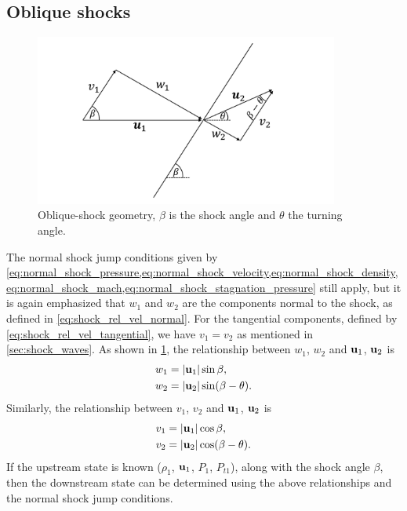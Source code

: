 \documentclass[oneside,a4paper,11pt]{report}
\begin{document}
\subsection{Oblique shocks}
\begin{figure}[ht]
\centering
\includegraphics[width=10cm]{../../../images/oblique_shock.pdf}
\caption{Oblique-shock geometry, $\beta$ is the shock angle and $\theta$ the turning angle.}
\label{fig:oblique_shock}
\end{figure}
The normal shock jump conditions given by \cref{eq:normal_shock_pressure,eq:normal_shock_velocity,eq:normal_shock_density,eq:normal_shock_mach,eq:normal_shock_stagnation_pressure} still apply, but it is again emphasized that $w_1$ and $w_2$ are the components normal to the shock, as defined in \cref{eq:shock_rel_vel_normal}. For the tangential components, defined by \cref{eq:shock_rel_vel_tangential}, we have $v_1 = v_2$ as mentioned in \cref{sec:shock_waves}. As shown in \cref{fig:oblique_shock}, the relationship between $w_1$, $w_2$ and $\mathbf{u}_1$, $\mathbf{u}_2$ is
\begin{align}
w_1 &= |\mathbf{u}_1| \sin{ \beta }, \nonumber \\
w_2 &= |\mathbf{u}_2| \sin( \beta - \theta ).
\end{align}
Similarly, the relationship between $v_1$, $v_2$ and $\mathbf{u}_1$, $\mathbf{u}_2$ is
\begin{align}
v_1 &= |\mathbf{u}_1| \cos{ \beta }, \nonumber \\
v_2 &= |\mathbf{u}_2| \cos (\beta - \theta).
\end{align}
If the upstream state is known ($\rho_1$, $\mathbf{u}_1$, $P_1$, $P_{t1}$), along with the shock angle $\beta$, then the downstream state can be determined using the above relationships and the normal shock jump conditions.
\end{document}

